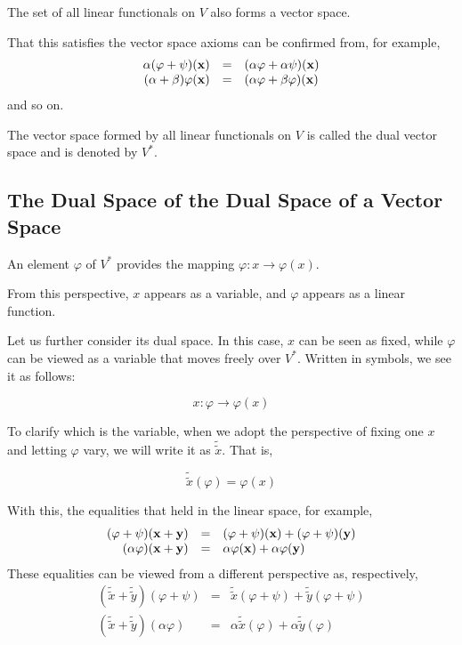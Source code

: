 \documentclass[uplatex,a4j,12pt,dvipdfmx]{jsarticle}
\begin{document}
The set of all linear functionals on $V$ also forms a vector space.

That this satisfies the vector space axioms can be confirmed from, for example,
\[
	\begin{array}{rcl}
		\alpha (\varphi + \psi) (\bf{x} ) & = & ( \alpha \varphi + \alpha \psi) (\bf{x} )
		\\
		(\alpha + \beta) \varphi (\bf{x}) & = & (\alpha \varphi + \beta \varphi) (\bf{x})
	\end{array}
\]
and so on.

The vector space formed by all linear functionals on $V$ is called the dual vector space and is denoted by $V^{*}$.

\subsection{The Dual Space of the Dual Space of a Vector Space}

An element $\varphi$ of $V^{*}$ provides the mapping $\varphi : x \to \varphi(x)$.

From this perspective, $x$ appears as a variable, and $\varphi$ appears as a linear function.

Let us further consider its dual space.
In this case, $x$ can be seen as fixed, while $\varphi$ can be viewed as a variable that moves freely over $V^{*}$.
Written in symbols, we see it as follows:

$$
	x : \varphi \to \varphi(x)
$$

To clarify which is the variable, when we adopt the perspective of fixing one $x$ and letting $\varphi$ vary, we will write it as $\tilde{\tilde{x}}$.
That is,

$$
	\tilde{\tilde{x}}(\varphi) = \varphi(x)
$$

With this, the equalities that held in the linear space, for example,
\[
	\begin{array}{rcl}
		(\varphi + \psi) (\bf{x} + \bf{y})
		 & = &
		(\varphi + \psi) (\bf{x}) + (\varphi + \psi) (\bf{y})
		\\
		(\alpha \varphi) (\bf{x} + \bf{y})
		 & = &
		\alpha \varphi (\bf{x}) + \alpha \varphi (\bf{y})
	\end{array}
\]
These equalities can be viewed from a different perspective as, respectively,
\[
	\begin{array}{rcl}
		(\tilde{\tilde{x}} + \tilde{\tilde{y}} ) (\varphi + \psi)
		 & = &
		\tilde{\tilde{x}} (\varphi + \psi)  + \tilde{\tilde{y}} (\varphi + \psi)
		\\
		(\tilde{\tilde{x}} + \tilde{\tilde{y}} ) (\alpha \varphi)
		 & = &
		\alpha \tilde{\tilde{x}} (\varphi) + \alpha \tilde{\tilde{y}} (\varphi)
	\end{array}
\]
\end{document}
